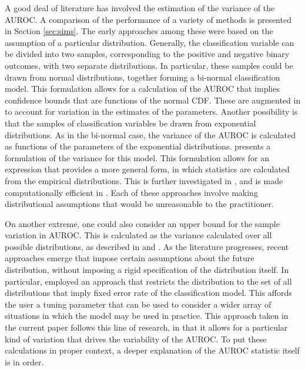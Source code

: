 A good deal of literature has involved the estimation of the variance of the AUROC.
%
A comparison of the performance of a variety of methods is presented in Section \ref{sec:sims}.
%
The early approaches among these were based on the assumption of a particular distribution.
Generally, the classification variable can be divided into two samples, corresponding to the positive and negative binary outcomes, with two separate distributions.
In particular, these samples could be drawn from normal distributions, together forming a bi-normal classification model.
This formulation allows for a calculation of the AUROC that implies confidence bounds that are functions of the normal CDF.
These are augmented in \citet{demidenko2012} to account for variation in the estimates of the parameters.
Another possibility is that the samples of classification variables be drawn from exponential distributions.
As in the bi-normal case, the variance of the AUROC is calculated as functions of the parameters of the exponential distributions.
\citet{hanleymcneil1982} presents a formulation of the variance for this model.
This formulation allows for an expression that provides a more general form, in which statistics are calculated from the empirical distributions.
This is further investigated in \citet{delong1988}, and is made computationally efficient in \citet{sunxu2014}.
Each of these approaches involve making distributional assumptions that would be unreasonable to the practitioner.

On another extreme, one could also consider an upper bound for the sample variation in AUROC.
This is calculated as the variance calculated over all possible distributions, as described in \citet{birn1957} and \citet{vandan1915}.
As the literature progresses, recent approaches emerge that impose certain assumptions about the future distribution,
without imposing a rigid specification of the distribution itself.
%
In particular, \citet{cortezMohri2004} employed an approach that restricts the distribution to the set of all distributions
that imply fixed error rate of the classification model.
This affords the user a tuning parameter that can be used to consider a wider array of situations in which the model may be used in practice.
%
This approach taken in the current paper follows this line of research, in that it allows for a particular kind of variation that drives the variability of the AUROC.
%
To put these calculations in proper context, a deeper explanation of the AUROC statistic itself is in order.

